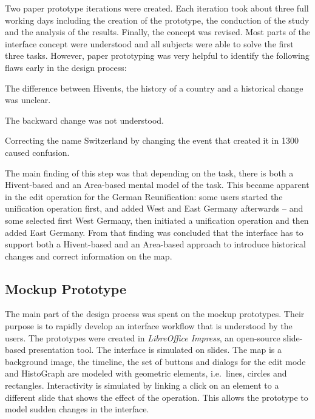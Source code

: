 Two paper prototype iterations were created. Each iteration took about three full working days including the creation of the prototype, the conduction of the study and the analysis of the results. Finally, the concept was revised.
Most parts of the interface concept were understood and all subjects were able to solve the first three tasks. However, paper prototyping was very helpful to identify the following flaws early in the design process:

\begin{compactenum}
  \item The difference between Hivents, the history of a country and a historical change was unclear.
  \item The backward change was not understood.
  \item Correcting the name Switzerland by changing the event that created it in 1300 caused confusion.
\end{compactenum}

The main finding of this step was that depending on the task, there is both a Hivent-based and an Area-based mental model of the task. This became apparent in the edit operation for the German Reunification: some users started the unification operation first, and added West and East Germany afterwards -- and some selected first West Germany, then initiated a unification operation and then added East Germany. From that finding was concluded that the interface has to support both a Hivent-based and an Area-based approach to introduce historical changes and correct information on the map.


\subsection{Mockup Prototype} %
\label{sub:mockup_prototype}

The main part of the design process was spent on the mockup prototypes. Their purpose is to rapidly develop an interface workflow that is understood by the users. The prototypes were created in \emph{LibreOffice Impress}, an open-source slide-based presentation tool. The interface is simulated on slides. The map is a background image, the timeline, the set of buttons and dialogs for the edit mode and HistoGraph are modeled with geometric elements, i.e.\ lines, circles and rectangles. Interactivity is simulated by linking a click on an element to a different slide that shows the effect of the operation. This allows the prototype to model sudden changes in the interface.

